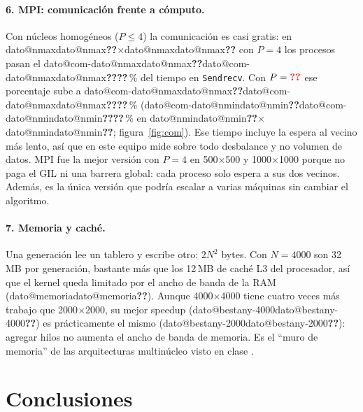 \documentclass[11pt,a4paper]{article}
\makeatletter
\newcommand{\dato}[1]{\ifcsname dato@#1\endcsname\csname dato@#1\endcsname\else\textbf{\color{red}??}\fi}
\newcommand{\x}{$\times$}
\newcommand{\code}[1]{\texttt{#1}}
\makeatother
\begin{document}
\begin{table}[H]
\centering\small
\caption{Fracción serial efectiva de Karp--Flatt (valores bajos son mejores).}\label{tab:karp}

\end{table}

\paragraph{6. MPI: comunicación frente a cómputo.}
Con núcleos homogéneos ($P\le4$) la comunicación es casi gratis: en \dato{nmax}\x\dato{nmax} con $P=4$ los procesos pasan
el \dato{com-\dato{nmax}-4}\,\% del tiempo en \code{Sendrecv}. Con $P=\dato{pmax}$ ese porcentaje sube a
\dato{com-\dato{nmax}}\,\% (\dato{com-\dato{nmin}}\,\% en \dato{nmin}\x\dato{nmin}; figura~\ref{fig:com}). Ese tiempo
incluye la espera al vecino más lento, así que en este equipo mide sobre todo desbalance y no volumen de datos.
MPI fue la mejor versión con $P=4$ en 500\x500 y 1000\x1000 porque no paga el GIL ni una barrera global: cada
proceso solo espera a sus dos vecinos. Además, es la única versión que podría escalar a varias máquinas sin cambiar el
algoritmo.

\paragraph{7. Memoria y caché.}
Una generación lee un tablero y escribe otro: $2N^2$ bytes. Con $N=4000$ son 32\,MB por generación, bastante más que
los 12\,MB de caché L3 del procesador, así que el kernel queda limitado por el ancho de banda de la RAM
(\dato{memoria}). Aunque 4000\x4000 tiene cuatro veces más trabajo que 2000\x2000, su mejor speedup
(\dato{bestany-4000}) es prácticamente el mismo (\dato{bestany-2000}): agregar hilos no aumenta el ancho de banda de
memoria. Es el ``muro de memoria'' de las arquitecturas multinúcleo visto en clase \cite{pastrana-paralelismo}.

\section{Conclusiones}\label{sec:conclusiones}
\end{document}
